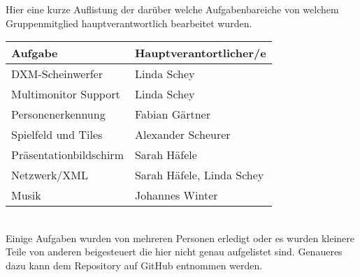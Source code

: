 Hier eine kurze Auflistung der darüber welche Aufgabenbareiche von welchem Gruppenmitglied hauptverantwortlich bearbeitet wurden.\\
\begin{tabular}[hc]{|l|l|}
\hline
\textbf{Aufgabe} & \textbf{Hauptverantortlicher/e}\\
\hline
DXM-Scheinwerfer&Linda Schey\\
Multimonitor Support& Linda Schey\\
Personenerkennung& Fabian Gärtner\\
Spielfeld und Tiles& Alexander Scheurer\\
Präsentationbildschirm& Sarah Häfele\\
Netzwerk/XML& Sarah Häfele, Linda Schey\\
Musik&Johannes Winter\\
\hline
\end{tabular}
\\
Einige Aufgaben wurden von mehreren Personen erledigt oder es wurden kleinere Teile von anderen beigesteuert die hier nicht genau aufgelistet sind. Genaueres dazu kann dem Repository auf GitHub entnommen werden.
